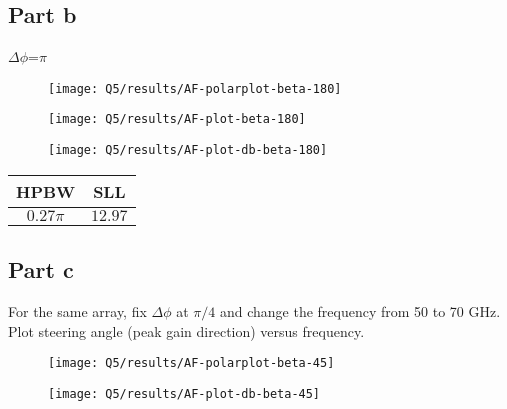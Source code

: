 \documentclass[12pt,onecolumn,a4paper]{article}
\begin{document}
\subsection{Part b}
{\color{questioncolor}
$\Delta\phi$=$\pi$\\
}


\begin{figure}[H]
	\centering
	\texttt{[image: Q5/results/AF-polarplot-beta-180]}
	\caption{}
	\label{fig:af-polarplot-beta-180}
\end{figure}

\begin{figure}[H] 
	\centering
	\texttt{[image: Q5/results/AF-plot-beta-180]}
	\caption{}
	\label{fig:af-plot-beta-180}
\end{figure}

\begin{figure}[H] 
	\centering
	\texttt{[image: Q5/results/AF-plot-db-beta-180]}
	\caption{}
	\label{fig:af-plot-db-beta-180}
\end{figure}



\begin{table}[H]
	\centering
	\begin{tabular}{cc}
		\toprule
		\textbf{HPBW} & \textbf{SLL} \\
		\midrule
		$0.27 \pi$ & $12.97$ \\
		\bottomrule
	\end{tabular}
\end{table}







\subsection{Part c}
{\color{questioncolor}
For the same array, fix $\Delta\phi$ at $\pi/4$ and change the frequency from 50 to 70 GHz.\\  Plot steering angle (peak gain direction) versus frequency.\\}


\begin{figure}[H]
	\centering
	\texttt{[image: Q5/results/AF-polarplot-beta-45]}
	\caption{}
	\label{fig:af-polarplot-beta-45}
\end{figure}

\begin{figure}[H]
	\centering
	\texttt{[image: Q5/results/AF-plot-db-beta-45]}
	\caption{}
	\label{fig:af-plot-db-beta-45}
\end{figure}
\end{document}
